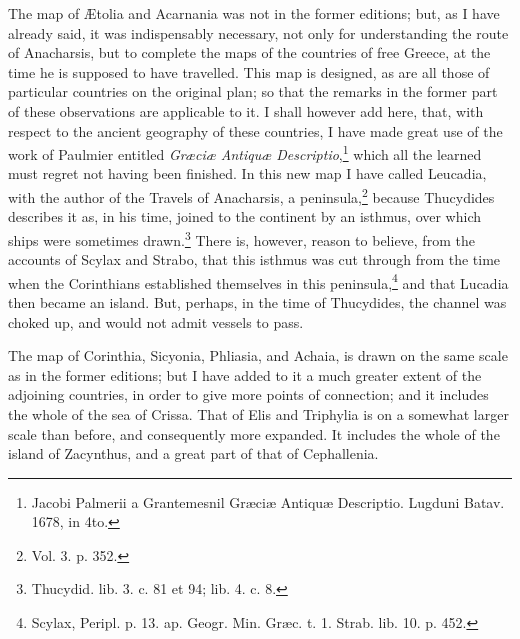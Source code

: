 \documentclass[a4paper, 11pt, oneside, polutonikogreek, english]{article}
\begin{document}
The map of Ætolia and Acarnania was not in the former editions; but, as I have already said, it was indispensably necessary, not only for understanding the route of Anacharsis, but to complete the maps of the countries of free Greece, at the time he is supposed to have travelled. This map is designed, as are all those of particular countries on the original plan; so that the remarks in the former part of these observations are applicable to it. I shall however add here, that, with respect to the ancient geography of these countries, I have made great use of the work of Paulmier entitled \emph{Græciæ Antiquæ Descriptio},\footnote{Jacobi Palmerii a Grantemesnil Græciæ Antiquæ Descriptio. Lugduni Batav. 1678, in 4to.} which all the learned must regret not having been finished. In this new map I have called Leucadia, with the author of the Travels of Anacharsis, a peninsula,\footnote{Vol. 3. p. 352.} because Thucydides describes it as, in his time, joined to the continent by an isthmus, over which ships were sometimes drawn.\footnote{Thucydid. lib. 3. c. 81 et 94; lib. 4. c. 8.} There is, however, reason to believe, from the accounts of Scylax and Strabo, that this isthmus was cut through from the time when the Corinthians established themselves in this peninsula,\footnote{Scylax, Peripl. p. 13. ap. Geogr. Min. Græc. t. 1. Strab. lib. 10. p. 452.} and that Lucadia then became an island. But, perhaps, in the time of Thucydides, the channel was choked up, and would not admit vessels to pass.

The map of Corinthia, Sicyonia, Phliasia, and Achaia, is drawn on the same scale as in the former editions; but I have added to it a much greater extent of the adjoining countries, in order to give more points of connection; and it includes the whole of the sea of Crissa. That of Elis and Triphylia is on a somewhat larger scale than before, and consequently more expanded. It includes the whole of the island of Zacynthus, and a great part of that of Cephallenia.
\end{document}
